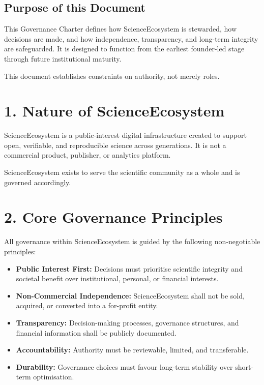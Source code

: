 \subsection*{Purpose of this Document}
This Governance Charter defines how ScienceEcosystem is stewarded, how decisions are made, and how independence, transparency, and long-term integrity are safeguarded. It is designed to function from the earliest founder-led stage through future institutional maturity.

This document establishes constraints on authority, not merely roles.

\section*{1. Nature of ScienceEcosystem}

ScienceEcosystem is a public-interest digital infrastructure created to support open, verifiable, and reproducible science across generations. It is not a commercial product, publisher, or analytics platform.

ScienceEcosystem exists to serve the scientific community as a whole and is governed accordingly.

\section*{2. Core Governance Principles}

All governance within ScienceEcosystem is guided by the following non-negotiable principles:

\begin{itemize}
    \item \textbf{Public Interest First:} Decisions must prioritise scientific integrity and societal benefit over institutional, personal, or financial interests.
    \item \textbf{Non-Commercial Independence:} ScienceEcosystem shall not be sold, acquired, or converted into a for-profit entity.
    \item \textbf{Transparency:} Decision-making processes, governance structures, and financial information shall be publicly documented.
    \item \textbf{Accountability:} Authority must be reviewable, limited, and transferable.
    \item \textbf{Durability:} Governance choices must favour long-term stability over short-term optimisation.
\end{itemize}

